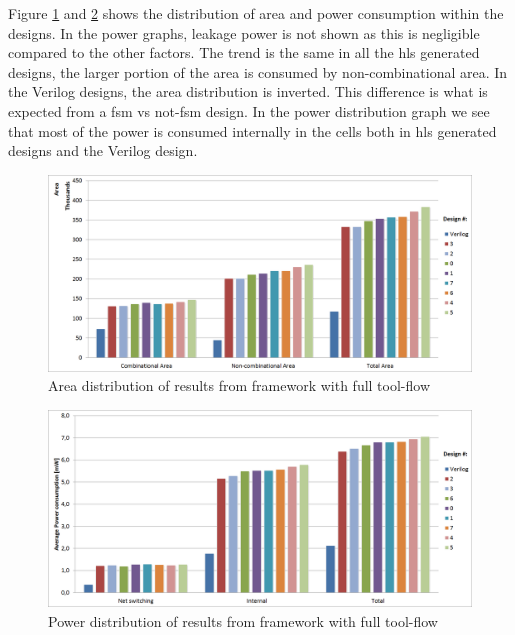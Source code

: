 Figure \ref{fig:resultgraphareaframeworkrun2} and \ref{fig:resultgraphpowerframeworkrun2} shows the distribution of area and power consumption within the designs. In the power graphs, leakage power is not shown as this is negligible compared to the other factors. The trend is the same in all the \gls{hls} generated designs, the larger portion of the area is consumed by non-combinational area. In the Verilog designs, the area distribution is inverted. This difference is what is expected from a \gls{fsm} vs not-\gls{fsm} design. In the power distribution graph we see that most of the power is consumed internally in the cells both in \gls{hls} generated designs and the Verilog design.

\begin{figure}[hbpt]
\centering
\includegraphics[width=\textwidth]{../figs/resultGraphAreaDistribution.png}
\caption{\label{fig:resultgraphareaframeworkrun2}Area distribution of results from framework with full tool-flow}
\end{figure}

\begin{figure}[hbpt]
\centering
\includegraphics[width=\textwidth]{../figs/resultGraphPowerDistribution.png}
\caption{\label{fig:resultgraphpowerframeworkrun2}Power distribution of results from framework with full tool-flow}
\end{figure}


